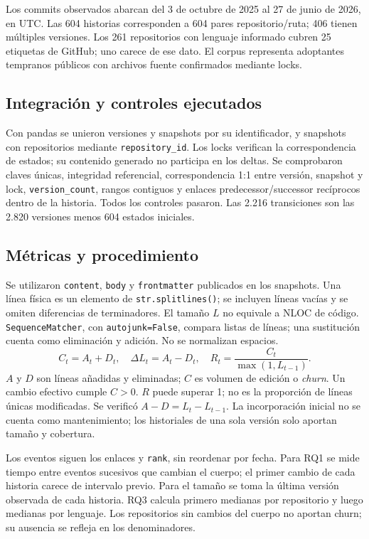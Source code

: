 \documentclass[conference,a4paper]{IEEEtran}
\begin{document}
Los commits observados abarcan del 3 de octubre de 2025 al 27 de junio de 2026, en UTC. Las 604 historias corresponden a 604 pares repositorio/ruta; 406 tienen múltiples versiones. Los 261 repositorios con lenguaje informado cubren 25 etiquetas de GitHub; uno carece de ese dato. El corpus representa adoptantes tempranos públicos con archivos fuente confirmados mediante locks.

\subsection{Integración y controles ejecutados}
Con pandas se unieron versiones y snapshots por su identificador, y snapshots con repositorios mediante \texttt{repository\_id}. Los locks verifican la correspondencia de estados; su contenido generado no participa en los deltas. Se comprobaron claves únicas, integridad referencial, correspondencia 1:1 entre versión, snapshot y lock, \texttt{version\_count}, rangos contiguos y enlaces predecessor/successor recíprocos dentro de la historia. Todos los controles pasaron. Las 2.216 transiciones son las 2.820 versiones menos 604 estados iniciales.

\subsection{Métricas y procedimiento}
Se utilizaron \texttt{content}, \texttt{body} y \texttt{frontmatter} publicados en los snapshots. Una línea física es un elemento de \texttt{str.splitlines()}; se incluyen líneas vacías y se omiten diferencias de terminadores. El tamaño $L$ no equivale a NLOC de código. \texttt{SequenceMatcher}, con \texttt{autojunk=False}, compara listas de líneas; una sustitución cuenta como eliminación y adición. No se normalizan espacios.
\begin{equation}
C_t=A_t+D_t,\quad \Delta L_t=A_t-D_t,\quad
R_t=\frac{C_t}{\max(1,L_{t-1})}.
\end{equation}
$A$ y $D$ son líneas añadidas y eliminadas; $C$ es volumen de edición o \textit{churn}. Un cambio efectivo cumple $C>0$. $R$ puede superar 1; no es la proporción de líneas únicas modificadas. Se verificó $A-D=L_t-L_{t-1}$. La incorporación inicial no se cuenta como mantenimiento; los historiales de una sola versión solo aportan tamaño y cobertura.

Los eventos siguen los enlaces y \texttt{rank}, sin reordenar por fecha. Para RQ1 se mide tiempo entre eventos sucesivos que cambian el cuerpo; el primer cambio de cada historia carece de intervalo previo. Para el tamaño se toma la última versión observada de cada historia. RQ3 calcula primero medianas por repositorio y luego medianas por lenguaje. Los repositorios sin cambios del cuerpo no aportan churn; su ausencia se refleja en los denominadores.
\end{document}
